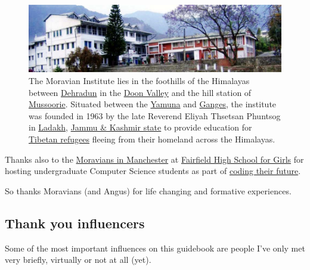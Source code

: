 \documentclass[
]{book}
\begin{document}
\begin{figure}

{\centering \includegraphics[width=1\linewidth]{images/moravian-insitute} 

}

\caption{The Moravian Institute lies in the foothills of the Himalayas between \href{https://en.wikipedia.org/wiki/Dehradun}{Dehradun} in the \href{https://en.wikipedia.org/wiki/Doon_Valley}{Doon Valley} and the hill station of \href{https://en.wikipedia.org/wiki/Mussoorie}{Mussoorie}. Situated between the \href{https://en.wikipedia.org/wiki/Yamuna}{Yamuna} and \href{https://en.wikipedia.org/wiki/Ganges}{Ganges}, the institute was founded in 1963 by the late Reverend Eliyah Thsetsan Phuntsog in \href{https://en.wikipedia.org/wiki/Ladakh}{Ladakh}, \href{https://en.wikipedia.org/wiki/Jammu_and_Kashmir_(state)}{Jammu \& Kashmir state} to provide education for \href{https://en.wikipedia.org/wiki/Tibetan_diaspora}{Tibetan refugees} fleeing from their homeland across the Himalayas.}\label{fig:moravian-fig}
\end{figure}



Thanks also to the \href{https://en.wikipedia.org/wiki/Fairfield_Moravian_Church}{Moravians in Manchester} at \href{https://en.wikipedia.org/wiki/Fairfield_High_School_for_Girls}{Fairfield High School for Girls} for hosting undergraduate Computer Science students as part of \href{https://personalpages.manchester.ac.uk/staff/duncan.hull/coding-their-future}{coding their future}.

So thanks Moravians (and Angus) for life changing and formative experiences. 🙏

\hypertarget{influences}{%
\subsection{Thank you influencers}\label{influences}}

Some of the most important influences on this guidebook are people I've only met very briefly, virtually or not at all (yet).
\end{document}
